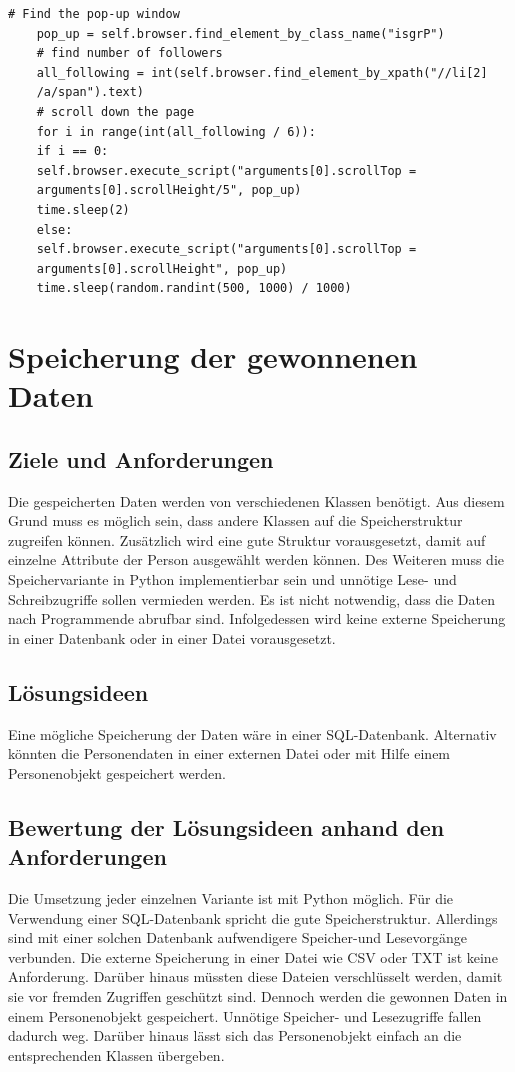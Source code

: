 	\begin{lstlisting}[caption=Herunterscrollen des Pop-up Fensters,label={lst:AlgoZumDurchscrollen}]
	# Find the pop-up window
	pop_up = self.browser.find_element_by_class_name("isgrP")        
	# find number of followers
	all_following = int(self.browser.find_element_by_xpath("//li[2]
	/a/span").text)
	# scroll down the page
	for i in range(int(all_following / 6)):
	if i == 0:
	self.browser.execute_script("arguments[0].scrollTop = 
	arguments[0].scrollHeight/5", pop_up)
	time.sleep(2)
	else:
	self.browser.execute_script("arguments[0].scrollTop = 
	arguments[0].scrollHeight", pop_up)
	time.sleep(random.randint(500, 1000) / 1000)
	\end{lstlisting}	

\section{Speicherung der gewonnenen Daten}
	\subsection{Ziele und Anforderungen}
	Die gespeicherten Daten werden von verschiedenen Klassen benötigt. Aus diesem Grund muss es möglich sein, dass andere Klassen auf die Speicherstruktur zugreifen können. Zusätzlich wird eine gute Struktur vorausgesetzt, damit auf einzelne Attribute der Person ausgewählt werden können. Des Weiteren muss die Speichervariante in Python implementierbar sein und unnötige Lese- und Schreibzugriffe sollen vermieden werden. Es ist nicht notwendig, dass die Daten nach Programmende abrufbar sind. Infolgedessen wird keine externe Speicherung in einer Datenbank oder in einer Datei vorausgesetzt.
	\subsection{Lösungsideen}
	Eine mögliche Speicherung der Daten wäre in einer SQL-Datenbank. Alternativ könnten die Personendaten in einer externen Datei oder mit Hilfe einem Personenobjekt gespeichert werden.
	\subsection{Bewertung der Lösungsideen anhand den Anforderungen}
	Die Umsetzung jeder einzelnen Variante ist mit Python möglich. Für die Verwendung einer SQL-Datenbank spricht die gute Speicherstruktur. Allerdings sind mit einer solchen Datenbank aufwendigere Speicher-und Lesevorgänge verbunden. Die externe Speicherung in einer Datei wie CSV oder TXT ist keine Anforderung. Darüber hinaus müssten diese Dateien verschlüsselt werden, damit sie vor fremden Zugriffen geschützt sind. Dennoch werden die gewonnen Daten in einem Personenobjekt gespeichert. Unnötige Speicher- und Lesezugriffe fallen dadurch weg. Darüber hinaus lässt sich das Personenobjekt einfach an die entsprechenden Klassen übergeben.
